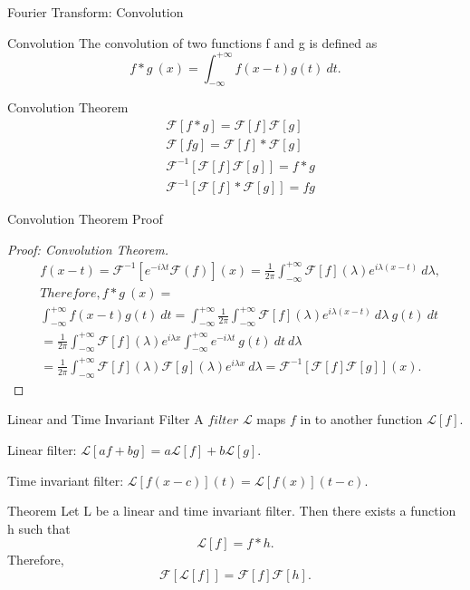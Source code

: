 \documentclass{beamer}
\begin{document}
	\begin{frame}{Fourier Transform: Convolution}
		\begin{block}{Convolution}
			The convolution of two functions f and g is defined as
			\[
			f*g\ (x) = \int_{-\infty}^{+\infty}f(x-t)g(t)\ dt.
			\]
		\end{block}
		\begin{block}{Convolution Theorem}
			\begin{align*}
				&\mathcal{F}[f*g] = \mathcal{F}[f]\mathcal{F}[g] \\
				&\mathcal{F}[fg] = \mathcal{F}[f]*\mathcal{F}[g] \\
				&\mathcal{F}^{-1}[\mathcal{F}[f]\mathcal{F}[g]] = f*g \\
				&\mathcal{F}^{-1}[\mathcal{F}[f]*\mathcal{F}[g]] = fg
			\end{align*}
		\end{block}
	\end{frame}
	
	\begin{frame}{Convolution Theorem Proof}
		\begin{proof}[Proof: Convolution Theorem]
			\begin{align*}
				& f(x-t) = \mathcal{F}^{-1}[e^{-i\lambda t}\mathcal{F}(f)](x) = \frac{1}{2\pi}\int_{-\infty}^{+\infty}\mathcal{F}[f](\lambda)e^{i\lambda (x-t)}\ d\lambda, \\
				& Therefore, f*g\ (x) =\\
				& \int_{-\infty}^{+\infty}f(x-t)g(t)\ dt = \int_{-\infty}^{+\infty}\frac{1}{2\pi}\int_{-\infty}^{+\infty}\mathcal{F}[f](\lambda)e^{i\lambda (x-t)}\ d\lambda\ g(t)\ dt \\
				& = \frac{1}{2\pi}\int_{-\infty}^{+\infty}\mathcal{F}[f](\lambda)e^{i\lambda x}\int_{-\infty}^{+\infty}e^{-i\lambda t}\ g(t) \ dt\ d\lambda \\
				& = \frac{1}{2\pi}\int_{-\infty}^{+\infty}\mathcal{F}[f](\lambda)\mathcal{F}[g](\lambda)e^{i\lambda x}\ d\lambda = \mathcal{F}^{-1}[\mathcal{F}[f]\mathcal{F}[g]](x).
			\end{align*}
		\end{proof}
	\end{frame}
	\begin{frame}{Linear and Time Invariant Filter}
		A $filter$ $\mathcal{L}$ maps $f$ in to another function $\mathcal{L}[f]$.
		
		Linear filter: $\mathcal{L}[af+bg] = a\mathcal{L}[f] + b\mathcal{L}[g]$.
		
		Time invariant filter: $\mathcal{L}[f(x-c)](t) = \mathcal{L}[f(x)](t-c)$.
		\begin{block}{Theorem}
			Let L be a linear and time invariant filter. Then there exists a function h such that
			\[
			\mathcal{L}[f] = f*h.
			\]
			Therefore,
			\[
			\mathcal{F}[\mathcal{L}[f]] = \mathcal{F}[f]\mathcal{F}[h].
			\]
		\end{block}
	\end{frame}
	
\end{document}

